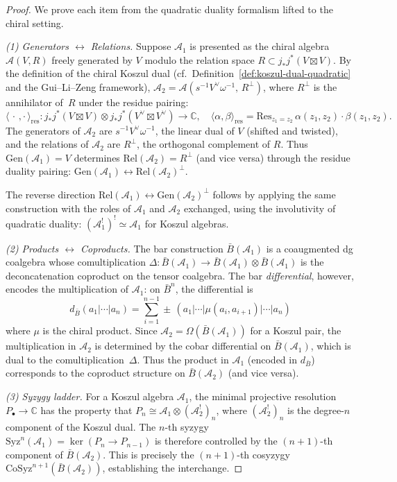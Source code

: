 \begin{proof}
We prove each item from the quadratic duality formalism lifted to the chiral setting.

\emph{(1) Generators $\leftrightarrow$ Relations.}
Suppose $\mathcal{A}_1$ is presented as the chiral algebra $\mathcal{A}(V, R)$ freely generated by $V$ modulo the relation space $R \subset j_*j^*(V \boxtimes V)$.  By the definition of the chiral Koszul dual (cf.\ Definition~\ref{def:koszul-dual-quadratic} and the Gui--Li--Zeng framework), $\mathcal{A}_2 = \mathcal{A}(s^{-1}V^\vee \omega^{-1},\, R^\perp)$, where $R^\perp$ is the annihilator of~$R$ under the residue pairing:
\[
\langle\, \cdot\,, \cdot\, \rangle_{\mathrm{res}} : j_*j^*(V \boxtimes V) \otimes j_*j^*(V^\vee \boxtimes V^\vee) \to \mathbb{C}, \quad
\langle \alpha, \beta \rangle_{\mathrm{res}} = \mathrm{Res}_{z_1 = z_2}\, \alpha(z_1, z_2) \cdot \beta(z_1, z_2).
\]
The generators of $\mathcal{A}_2$ are $s^{-1}V^\vee\omega^{-1}$, the linear dual of $V$ (shifted and twisted), and the relations of $\mathcal{A}_2$ are $R^\perp$, the orthogonal complement of $R$.  Thus $\mathrm{Gen}(\mathcal{A}_1) = V$ determines $\mathrm{Rel}(\mathcal{A}_2) = R^\perp$ (and vice versa) through the residue duality pairing: $\mathrm{Gen}(\mathcal{A}_1) \leftrightarrow \mathrm{Rel}(\mathcal{A}_2)^\perp$.

The reverse direction $\mathrm{Rel}(\mathcal{A}_1) \leftrightarrow \mathrm{Gen}(\mathcal{A}_2)^\perp$ follows by applying the same construction with the roles of $\mathcal{A}_1$ and $\mathcal{A}_2$ exchanged, using the involutivity of quadratic duality: $(\mathcal{A}_1^!)^! \simeq \mathcal{A}_1$ for Koszul algebras.

\emph{(2) Products $\leftrightarrow$ Coproducts.}
The bar construction $\bar{B}(\mathcal{A}_1)$ is a coaugmented dg coalgebra whose comultiplication $\Delta: \bar{B}(\mathcal{A}_1) \to \bar{B}(\mathcal{A}_1) \otimes \bar{B}(\mathcal{A}_1)$ is the deconcatenation coproduct on the tensor coalgebra.  The bar \emph{differential}, however, encodes the multiplication of $\mathcal{A}_1$: on $\bar{B}^n$, the differential is
\[
d_{\bar{B}}(a_1 | \cdots | a_n) = \sum_{i=1}^{n-1} \pm\, (a_1 | \cdots | \mu(a_i, a_{i+1}) | \cdots | a_n)
\]
where $\mu$ is the chiral product.  Since $\mathcal{A}_2 = \Omega(\bar{B}(\mathcal{A}_1))$ for a Koszul pair, the multiplication in $\mathcal{A}_2$ is determined by the cobar differential on $\bar{B}(\mathcal{A}_1)$, which is dual to the comultiplication~$\Delta$.  Thus the product in $\mathcal{A}_1$ (encoded in $d_{\bar{B}}$) corresponds to the coproduct structure on $\bar{B}(\mathcal{A}_2)$ (and vice versa).

\emph{(3) Syzygy ladder.}
For a Koszul algebra $\mathcal{A}_1$, the minimal projective resolution $P_\bullet \to \mathbb{C}$ has the property that $P_n \cong \mathcal{A}_1 \otimes (\mathcal{A}_2^!)_n$, where $(\mathcal{A}_2^!)_n$ is the degree-$n$ component of the Koszul dual.  The $n$-th syzygy $\mathrm{Syz}^n(\mathcal{A}_1) = \ker(P_n \to P_{n-1})$ is therefore controlled by the $(n+1)$-th component of $\bar{B}(\mathcal{A}_2)$.  This is precisely the $(n+1)$-th cosyzygy $\mathrm{CoSyz}^{n+1}(\bar{B}(\mathcal{A}_2))$, establishing the interchange.
\end{proof}

